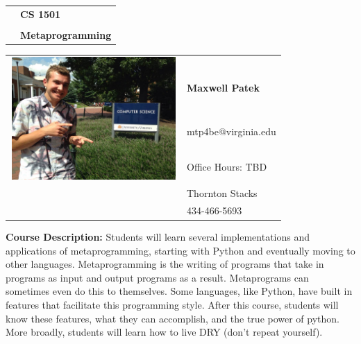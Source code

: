 \documentclass[11pt]{article}
\begin{document}
\begin{tabular}{ l l }
  & \LARGE \textbf{CS 1501} \\\\
  & \LARGE \textbf{Metaprogramming} \\
\end{tabular}
\vspace{10mm}

\begin{center}
\begin{tabular}{ l l }
  \multirow{6}{*}{\includegraphics[height=1.85in,width=2.5in]{14040198_10154458676878599_2951113492452685662_n.jpg}} & \\ \\
  & \textbf{\large Maxwell Patek} \\\\
  & \large mtp4be@virginia.edu \\
  & \large Office Hours: TBD \\
  & \large Thornton Stacks \\
  & \large 434-466-5693 \\
\end{tabular}
\end{center}

\vspace{10mm}


\textbf {\large  Course Description:} Students will learn several implementations and applications of metaprogramming, starting with Python and eventually moving to other languages. Metaprogramming is the writing of programs that take in programs as input and output programs as a result. Metaprograms can sometimes even do this to themselves. Some languages, like Python, have built in features that facilitate this programming style. After this course, students will know these features, what they can accomplish, and the true power of python. More broadly, students will learn how to live DRY (don't repeat yourself). \\
\end{document}
